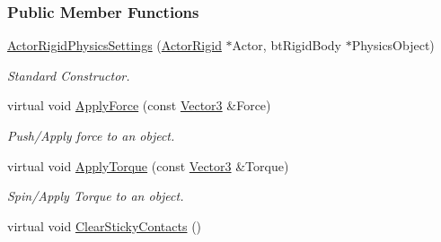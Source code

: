 \subsubsection*{Public Member Functions}
\begin{DoxyCompactItemize}
\item 
\hyperlink{classMezzanine_1_1ActorRigidPhysicsSettings_a01aac76583a043e4917546ab6fabe160}{ActorRigidPhysicsSettings} (\hyperlink{classMezzanine_1_1ActorRigid}{ActorRigid} $\ast$Actor, btRigidBody $\ast$PhysicsObject)
\begin{DoxyCompactList}\small\item\em Standard Constructor. \item\end{DoxyCompactList}\item 
virtual void \hyperlink{classMezzanine_1_1ActorRigidPhysicsSettings_aafa276832f06cc6a72f8ff0b8ccea155}{ApplyForce} (const \hyperlink{classMezzanine_1_1Vector3}{Vector3} \&Force)
\begin{DoxyCompactList}\small\item\em Push/Apply force to an object. \item\end{DoxyCompactList}\item 
virtual void \hyperlink{classMezzanine_1_1ActorRigidPhysicsSettings_a431d7e6e6f8a62d1ff626d2ccf5d7a6d}{ApplyTorque} (const \hyperlink{classMezzanine_1_1Vector3}{Vector3} \&Torque)
\begin{DoxyCompactList}\small\item\em Spin/Apply Torque to an object. \item\end{DoxyCompactList}\item 
\hypertarget{classMezzanine_1_1ActorRigidPhysicsSettings_a6a5f7320087dc36d235ed9551bba193a}{
virtual void \hyperlink{classMezzanine_1_1ActorRigidPhysicsSettings_a6a5f7320087dc36d235ed9551bba193a}{ClearStickyContacts} ()}
\label{classMezzanine_1_1ActorRigidPhysicsSettings_a6a5f7320087dc36d235ed9551bba193a}


\end{DoxyCompactItemize}
